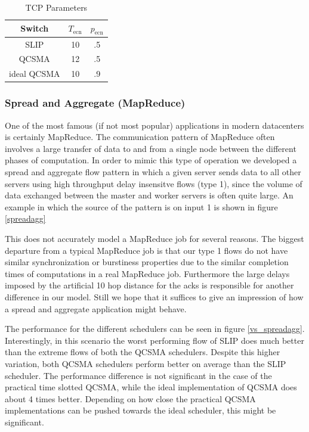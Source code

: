 \documentclass[11pt]{article}%
\begin{document}
\begin{table}[ht] \caption{TCP Parameters} 
\centering
\begin{tabular}{c c c}
 \hline\hline 
 Switch & $T_{\text{ecn}}$ & $p_{\text{ecn}}$ \\
  [0.5ex] \hline 
 SLIP&10&.5 \\
  QCSMA&12&.5  \\
   ideal  QCSMA&10&.9  \\
  [1.0ex] \hline 
  \end{tabular}
   \label{ecn_table} 
\end{table}


\subsubsection{Spread and Aggregate (MapReduce)}
One of the most famous (if not most popular) applications in modern datacenters is certainly MapReduce.  The communication pattern of MapReduce often involves a large transfer of data to and from a single node between the different phases of computation.  In order to mimic this type of operation we developed a spread and aggregate flow pattern in which a given server sends data to all other servers using high throughput delay insensitve flows (type 1), since the volume of data exchanged between the master and worker servers is often quite large.  An example in which the source of the pattern is on input 1 is shown in figure \ref{spreadagg}

This does not accurately model a MapReduce job for several reasons.  The biggest departure from a typical MapReduce job is that our type 1 flows do not have similar synchronization or burstiness properties due to the similar completion times of computations in a real MapReduce job.  Furthermore the large delays imposed by the artificial 10 hop distance for the acks is responsible for another difference in our model.  Still we hope that it suffices to give an impression of how a spread and aggregate application might behave.

The performance for the different schedulers can be seen in figure \ref{vs_spreadagg}.  Interestingly, in this scenario the worst performing flow of SLIP does much better than the extreme flows of both the QCSMA schedulers.  Despite this higher variation, both QCSMA schedulers perform better on average than the SLIP scheduler.  The performance difference is not significant in the case of the practical time slotted QCSMA, while the ideal implementation of QCSMA does about 4 times better.  Depending on how close the practical QCSMA implementations can be pushed towards the ideal scheduler, this might be significant.
\end{document}
